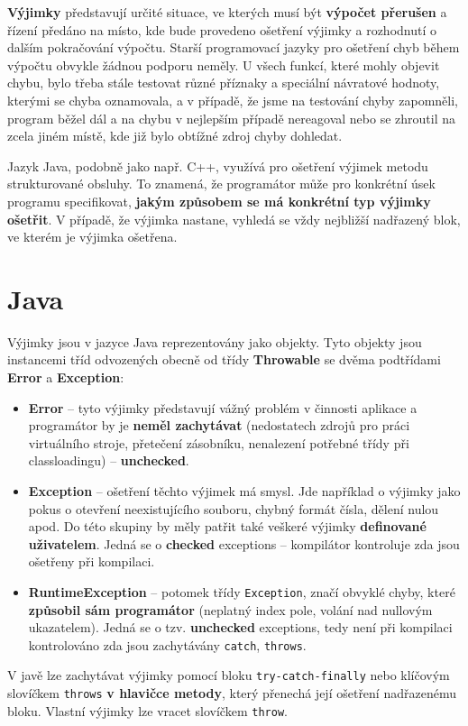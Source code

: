 \textbf{Výjimky} představují určité situace, ve kterých musí být \textbf{výpočet přerušen} a řízení předáno na místo, kde bude provedeno ošetření výjimky a rozhodnutí o dalším pokračování výpočtu. Starší programovací jazyky pro ošetření chyb během výpočtu obvykle žádnou podporu neměly. U všech funkcí, které mohly objevit chybu, bylo třeba stále testovat různé příznaky a speciální návratové hodnoty, kterými se chyba oznamovala, a v případě, že jsme na testování chyby zapomněli, program běžel dál a na chybu v nejlepším případě nereagoval nebo se zhroutil na zcela jiném místě, kde již bylo obtížné zdroj chyby dohledat.

Jazyk Java, podobně jako např. C++, využívá pro ošetření výjimek metodu strukturované obsluhy. To znamená, že programátor může pro konkrétní úsek programu specifikovat, \textbf{jakým způsobem se má konkrétní typ výjimky ošetřit}. V případě, že výjimka nastane, vyhledá se vždy nejbližší nadřazený blok, ve kterém je výjimka ošetřena.

\section{Java}
Výjimky jsou v jazyce Java reprezentovány jako objekty. Tyto objekty jsou instancemi tříd odvozených obecně od třídy \textbf{Throwable} se dvěma podtřídami \textbf{Error} a \textbf{Exception}:
\begin{itemize}
    \item \textbf{Error} -- tyto výjimky představují vážný problém v činnosti aplikace a programátor by je \textbf{neměl zachytávat} (nedostatech zdrojů pro práci virtuálního stroje, přetečení zásobníku, nenalezení potřebné třídy při classloadingu) -- \textbf{unchecked}.
    \item \textbf{Exception} -- ošetření těchto výjimek má smysl. Jde například o výjimky jako pokus o otevření neexistujícího souboru, chybný formát čísla, dělení nulou apod. Do této skupiny by měly patřit také veškeré výjimky \textbf{definované uživatelem}. Jedná se o \textbf{checked} exceptions -- kompilátor kontroluje zda jsou ošetřeny při kompilaci.
    \item \textbf{RuntimeException} -- potomek třídy \texttt{Exception}, značí obvyklé chyby, které \textbf{způsobil sám programátor} (neplatný index pole, volání nad nullovým ukazatelem). Jedná se o tzv. \textbf{unchecked} exceptions, tedy není při kompilaci kontrolováno zda jsou zachytávány \texttt{catch}, \texttt{throws}.
\end{itemize}
V javě lze zachytávat výjimky pomocí bloku \texttt{try-catch-finally} nebo klíčovým slovíčkem \texttt{throws} \textbf{v hlavičce metody}, který přenechá její ošetření nadřazenému bloku. Vlastní výjimky lze vracet slovíčkem \texttt{throw}.

